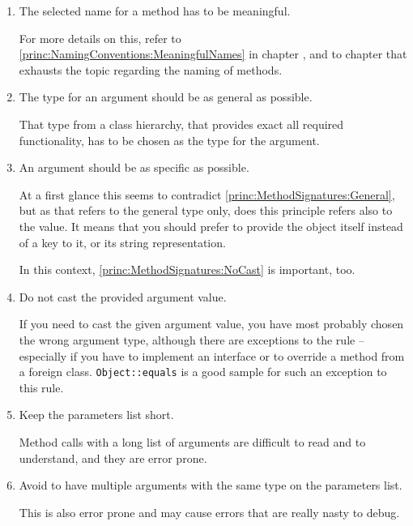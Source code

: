 \begin{enumerate}[label=P\arabic*.]
	\item{The selected name for a method has to be meaningful.

	For more details on this, refer to \ref{princ:NamingConventions:MeaningfulNames} in chapter , and to chapter  that exhausts the topic regarding the naming of methods.}

	\item{The type for an argument should be as general as possible.

That type from a class hierarchy, that provides exact all required functionality, has to be chosen as the type for the argument.}\label{princ:MethodSignatures:General}

	\item{An argument should be as specific as possible.

At a first glance this seems to contradict \ref{princ:MethodSignatures:General}, but as that refers to the general type only, does this principle refers also to the value. It means that you should prefer to provide the object itself instead of a key to it, or its string representation.

In this context, \ref{princ:MethodSignatures:NoCast} is important, too.}

	\item{Do not cast the provided argument value.

If you need to cast the given argument value, you have most probably chosen the wrong argument type, although there are exceptions to the rule – especially if you have to implement an interface or to override a method from a foreign class. \lstinline|Object::equals| is a good sample for such an exception to this rule.}\label{princ:MethodSignatures:NoCast}

	\item{Keep the parameters list short.

Method calls with a long list of arguments are difficult to read and to understand, and they are error prone.}

	\item{Avoid to have multiple arguments with the same type on the parameters list.

This is also error prone and may cause errors that are really nasty to debug.}
\end{enumerate}

